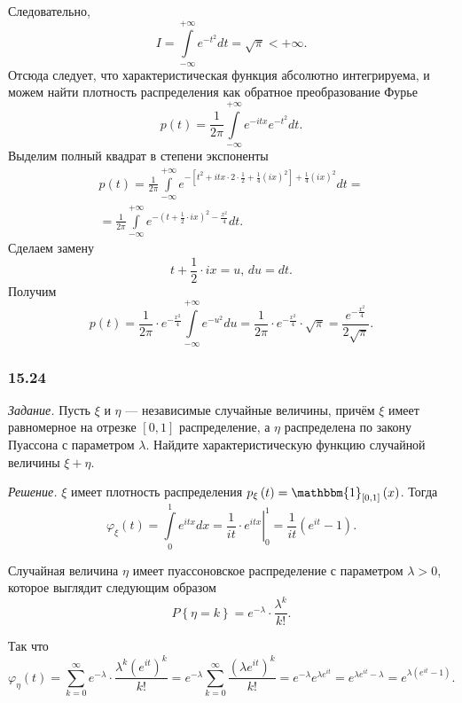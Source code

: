 \begin{enumerate}[label=\alph*)]
Следовательно,
$$I =
\int \limits_{- \infty }^{+ \infty } e^{- t^2} dt =
\sqrt{ \pi } <
+ \infty.$$
Отсюда следует, что характеристическая функция абсолютно интегрируема, и можем найти плотность распределения как обратное преобразование Фурье
$$p \left( t \right) =
\frac{1}{2 \pi } \int \limits_{- \infty }^{+ \infty } e^{- itx} e^{- t^2} dt.$$
Выделим полный квадрат в степени экспоненты
\begin{equation*}
\begin{split}
p \left( t \right) =
\frac{1}{2 \pi }
\int \limits_{- \infty }^{+ \infty } e^{- \left[ t^2 + itx \cdot 2 \cdot \frac{1}{2} + \frac{1}{4} \left( ix \right)^2 \right] + \frac{1}{4} \left( ix \right)^2} dt = \\
= \frac{1}{2 \pi } \int \limits_{- \infty }^{+ \infty } e^{- \left( t + \frac{1}{2} \cdot ix \right)^2 - \frac{x^2}{4}} dt.
\end{split}
\end{equation*}
Сделаем замену
$$t + \frac{1}{2} \cdot ix = u, \, du = dt.$$
Получим
$$p \left( t \right) =
\frac{1}{2 \pi } \cdot e^{- \frac{x^2}{4}} \int \limits_{- \infty }^{+ \infty } e^{- u^2} du =
\frac{1}{2 \pi } \cdot e^{- \frac{x^2}{4}} \cdot \sqrt{ \pi } =
\frac{e^{- \frac{x^2}{4}}}{2 \sqrt{ \pi }}.$$
\end{enumerate}

\subsubsection*{15.24}

\textit{Задание.}
Пусть $ \xi $ и $ \eta $ --- независимые случайные величины, причём $ \xi $ имеет равномерное на отрезке $ \left[ 0, 1 \right] $ распределение,
а $ \eta $ распределена по закону Пуассона с параметром $ \lambda $.
Найдите характеристическую функцию случайной величины $ \xi + \eta $.

\textit{Решение.} $ \xi $ имеет плотность распределения $p_{ \xi } \left( t \right) = \mathbbm{1}_{ \left[ 0, 1 \right] } \left( x \right) $.
Тогда
$$ \varphi_{ \xi } \left( t \right) =
\int \limits_0^1 e^{itx} dx =
\left. \frac{1}{it} \cdot e^{itx} \right|_0^1 =
\frac{1}{it} \left( e^{it} - 1 \right).$$

Случайная величина $ \eta $ имеет пуассоновское распределение с параметром $ \lambda > 0$, которое выглядит следующим образом
$$P \left\{ \eta = k \right\} =
e^{- \lambda } \cdot \frac{ \lambda^k}{k!}.$$

Так что
$$ \varphi_{ \eta } \left( t \right) =
\sum \limits_{k = 0}^{ \infty } e^{- \lambda } \cdot \frac{ \lambda^k \left( e^{it} \right)^k}{k!} =
e^{- \lambda } \sum \limits_{k = 0}^{ \infty } \frac{ \left( \lambda e^{it} \right)^k}{k!} =
e^{- \lambda } e^{ \lambda e^{it}} =
e^{ \lambda e^{it} - \lambda } =
e^{ \lambda \left( e^{it} - 1 \right) }.$$

